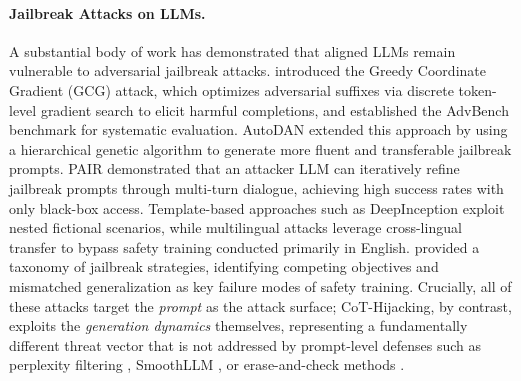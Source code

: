 \documentclass[11pt]{article}
\begin{document}
\paragraph{Jailbreak Attacks on LLMs.}
A substantial body of work has demonstrated that aligned LLMs remain vulnerable to adversarial jailbreak attacks. \citet{zou2023universal} introduced the Greedy Coordinate Gradient (GCG) attack, which optimizes adversarial suffixes via discrete token-level gradient search to elicit harmful completions, and established the AdvBench benchmark for systematic evaluation. AutoDAN \citep{liu2024autodan} extended this approach by using a hierarchical genetic algorithm to generate more fluent and transferable jailbreak prompts. PAIR \citep{chao2023jailbreaking} demonstrated that an attacker LLM can iteratively refine jailbreak prompts through multi-turn dialogue, achieving high success rates with only black-box access. Template-based approaches such as DeepInception \citep{li2023deepinception} exploit nested fictional scenarios, while multilingual attacks \citep{deng2024multilingual} leverage cross-lingual transfer to bypass safety training conducted primarily in English. \citet{wei2024jailbroken} provided a taxonomy of jailbreak strategies, identifying competing objectives and mismatched generalization as key failure modes of safety training. Crucially, all of these attacks target the \emph{prompt} as the attack surface; CoT-Hijacking, by contrast, exploits the \emph{generation dynamics} themselves, representing a fundamentally different threat vector that is not addressed by prompt-level defenses such as perplexity filtering \citep{jain2023baseline}, SmoothLLM \citep{robey2023smoothllm}, or erase-and-check methods \citep{kumar2024certifying}.
\end{document}
